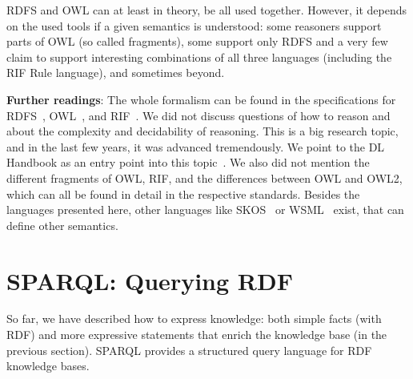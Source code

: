%

RDFS and OWL can at least in theory, be all used together.
However, it depends on the used tools if a given semantics is understood: some reasoners support parts of OWL (so called fragments), some support only RDFS and a very few claim to support interesting combinations of all three languages (including the RIF Rule language), and sometimes beyond.

\medskip

\textbf{Further readings}:
The whole formalism can be found in the specifications for RDFS~\cite{rdfs}, OWL~\cite{owl}, and RIF~\cite{rif}.
We did not discuss questions of how to reason and about the complexity and decidability of reasoning. 
This is a big research topic, and in the last few years, it was advanced tremendously. 
We point to the DL Handbook as an entry point into this topic~\cite{dl-handbook}.
We also did not mention the different fragments of OWL, RIF, and the differences between OWL and OWL2, which can all be found in detail in the respective standards.
Besides the languages presented here, other languages like SKOS~\cite{skos} or WSML~\cite{wsml} exist, that can define other semantics.

\section{SPARQL: Querying RDF}
\label{sparql}

So far, we have described how to express knowledge: both simple facts (with RDF) and more expressive statements that enrich the knowledge base (in the previous section).
SPARQL provides a structured query language for RDF knowledge bases.

